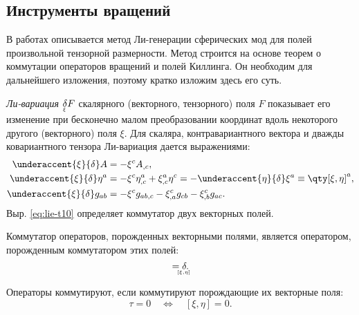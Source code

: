 \documentclass[\docroot/reports/draft/report.tex]{subfiles}
\begin{document}
\onlyinsubfile{\tableofcontents}

\subsection{Инструменты вращений}

    В работах  описывается метод Ли-генерации сферических мод для полей произвольной тензорной размерности. Метод строится на основе теорем о коммутации операторов вращений и полей Киллинга. Он необходим для дальнейшего изложения, поэтому кратко изложим здесь его суть.

    \textit{Ли-вариация} $\underaccent{\xi}{\delta} F$ скалярного (векторного, тензорного) поля $F$ показывает его изменение при бесконечно малом преобразовании координат вдоль некоторого другого (векторного) поля $\xi$. Для скаляра, контравариантного вектора и дважды ковариантного тензора Ли-вариация дается выражениями:
    \begin{align}\label{eq:lie-t00}
        \underaccent{\xi}{\delta} A &= - \xi^c A_{,c}, \\
        \label{eq:lie-t10}
        \underaccent{\xi}{\delta} \eta^a &=
            - \xi^c \eta^{a}_{,c} + \xi^a_{,c} \eta^c =
                - \underaccent{\eta}{\delta} \xi^a \equiv \qty[\xi,\eta]^a, \\
        \label{eq:lie-t02}
        \underaccent{\xi}{\delta} g_{ab} &=
            - \xi^c g_{ab,c} - \xi^c_{,a} g_{cb} - \xi^c_{,b} g_{ac}.
    \end{align}
    Выр. \ref{eq:lie-t10} определяет коммутатор двух векторных полей.
    \begin{theorem}
        Коммутатор операторов, порожденных векторными полями, является оператором, порожденным коммутатором этих полей:
        \begin{equation*}
            [\underaccent{\xi}{\delta},\underaccent{\eta}{\delta}] =
                \underaccent{[\xi,\eta]}{\delta}.
        \end{equation*}
    \end{theorem}
    \begin{theorem}
        Операторы коммутируют, если коммутируют порождающие их векторные поля:
        \begin{equation*}
            [\underaccent{\xi}{\delta},\underaccent{\eta}{\delta}]\tau = 0
                \quad\Leftrightarrow\quad
            [\xi,\eta] = 0 .
        \end{equation*}
    \end{theorem}
\end{document}
